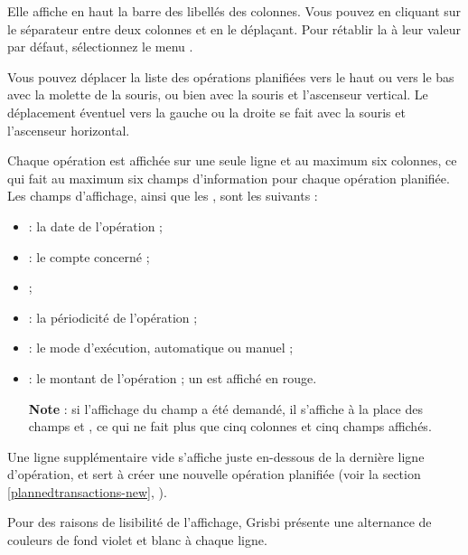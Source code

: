 Elle affiche en haut la barre des libellés des colonnes. Vous pouvez  en cliquant sur le séparateur entre deux colonnes et en le déplaçant. Pour rétablir la  à leur valeur par défaut, sélectionnez le menu .

Vous pouvez déplacer la liste des opérations planifiées vers le haut ou vers le bas avec la molette de la souris, ou bien avec la souris et l'ascenseur vertical. Le déplacement éventuel vers la gauche ou la droite se fait avec la souris et l'ascenseur horizontal.

Chaque opération est affichée sur une seule ligne et au maximum six colonnes, ce qui fait au maximum six champs d'information pour chaque opération planifiée. Les champs d'affichage, ainsi que les , sont les suivants :
\begin{itemize}
	 \item {} : la date de l'opération ;
	 \item {} : le compte concerné ;
	 \item {} ;
	 \item {} : la périodicité de l'opération ;
	 \item {} : le mode d'exécution, automatique ou manuel ; 
	 \item {} : le montant de l'opération ; un  est affiché en rouge{\couleur}.

\textbf{Note} : si l'affichage du champ  a été demandé, il s'affiche à la place des champs  et , ce qui ne fait plus que cinq colonnes et cinq champs affichés.	 
\end{itemize}

Une ligne supplémentaire vide s'affiche juste en-dessous de la dernière ligne d'opération, et sert à créer une nouvelle opération planifiée (voir la section \vref{plannedtransactions-new}, ).

Pour des raisons de lisibilité de l'affichage, Grisbi présente une alternance de couleurs de fond violet et blanc{\couleurs} à chaque ligne.

